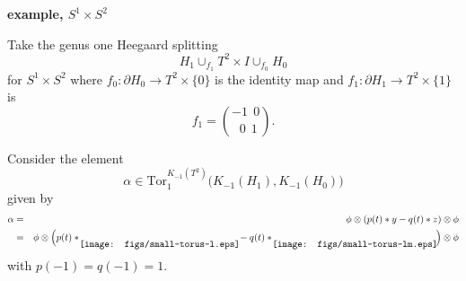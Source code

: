 \documentclass{slides}
\newcommand{\ot}{\otimes}
\newcommand{\torusL}{\raisebox{-7pt}{\mbox{}\hspace{-5pt}
                  \texttt{[image: figs/small-torus-l.eps]}\hspace{-2pt}\mbox{}}}
\newcommand{\torusLM}{\raisebox{-7pt}{\mbox{}\hspace{-5pt}
                  \texttt{[image: figs/small-torus-lm.eps]}\hspace{-2pt}\mbox{}}}
\theoremstyle{definition}
\begin{document}



\begin{slide}
\textbf{example, $S^1 \times S^2$}

Take the genus one Heegaard splitting
$$H_1 \cup_{f_1} T^2 \times I \cup_{f_0} H_0$$ for $S^1 \times S^2$ where
$f_0 : \partial H_0 \to T^2 \times \{0\}$ is the identity
map and
$f_1 : \partial H_1 \to T^2 \times \{1\}$ is
$$f_1 = \binom{-1~~0}{~~0~~1}.$$

Consider the element $$\alpha \in
\mathrm{Tor}_1^{K_{-1}(T^2)} \Big( K_{-1}(H_1), K_{-1}(H_0) \Big)$$ given by
\begin{eqnarray}
\alpha & = & \phi \ot (p(t)*y - q(t)*z) \ot \phi \nonumber \\
& = & \phi \ot \Big( p(t)*\torusL - q(t)*\torusLM \Big) \ot \phi \nonumber
\end{eqnarray}
with $p(-1) = q(-1) = 1$.
\end{slide}
\end{document}
